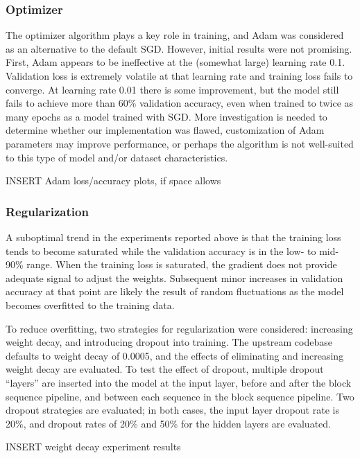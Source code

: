 \documentclass[letterpaper]{article} %
\begin{document}
\subsubsection{Optimizer}

The optimizer algorithm plays a key role in training, and Adam was considered as an alternative to the default SGD.
However, initial results were not promising.
First, Adam appears to be ineffective at the (somewhat large) learning rate 0.1. Validation loss is extremely volatile
at that learning rate and training loss fails to converge.
At learning rate 0.01 there is some improvement, but the model still fails to achieve more than 60\% validation
accuracy, even when trained to twice as many epochs as a model trained with SGD. More investigation is needed to
determine whether our implementation was flawed, customization of Adam parameters may improve performance, or perhaps
the algorithm is not well-suited to this type of model and/or dataset characteristics.

INSERT Adam loss/accuracy plots, if space allows

\subsubsection{Regularization}

A suboptimal trend in the experiments reported above is that the training loss tends to become saturated while the
validation accuracy is in the low- to mid-90\% range.
When the training loss is saturated, the gradient does not provide adequate signal to adjust the weights.
Subsequent minor increases in validation accuracy at that point are likely the result of random fluctuations as the
model becomes overfitted to the training data.

To reduce overfitting, two strategies for regularization were considered: increasing weight decay, and introducing
dropout into training.
The upstream codebase defaults to weight decay of 0.0005, and the effects of eliminating and increasing weight decay
are evaluated.
To test the effect of dropout, multiple dropout ``layers'' are inserted into the model at the input layer, before and
after the block sequence pipeline, and between each sequence in the block sequence pipeline.
Two dropout strategies are evaluated; in both cases, the input layer dropout rate is 20\%, and dropout rates of 20\%
and 50\% for the hidden layers are evaluated.

INSERT weight decay experiment results
\end{document}
